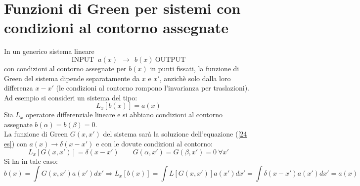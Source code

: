 \documentclass[twoside]{article}
\begin{document}
\section{Funzioni di Green per sistemi con condizioni al contorno assegnate}
In un generico sistema lineare
\begin{equation}
    \text{INPUT } \ a(x) \ \ \rightarrow \ \ b(x) \ \text{OUTPUT}
\end{equation}
con condizioni al contorno assegnate per $b(x)$ in punti fissati, la funzione di Green del sistema dipende separatamente da $x$ e $x'$, anzichè solo dalla loro differenza $x-x'$ (le condizioni al contorno rompono l'invarianza per traslazioni).\\
Ad esempio si consideri un sistema del tipo:
\begin{equation}\label{24 es}
    L_x[b(x)]=a(x)
\end{equation}
Sia $L_x$ operatore differenziale lineare e si abbiano condizioni al contorno assegnate $b(\alpha)=b(\beta)=0$.\\
La funzione di Green $G(x,x')$ del sistema sarà la soluzione dell'equazione (\ref{24 es}) con $a(x)\to\delta(x-x')$ e con le dovute condizioni al contorno:
\begin{equation}
    L_x[G(x,x')]=\delta(x-x') \qquad G(\alpha,x')=G(\beta,x')=0\ \forall x'
\end{equation}
Si ha in tale caso:
\begin{equation*}
    b(x)=\int G(x,x')a(x')dx' \Longrightarrow L_x[b(x)]=\int L[G(x,x')]a(x')dx'=\int\delta(x-x')a(x')dx'=a(x)
\end{equation*}
\end{document}
